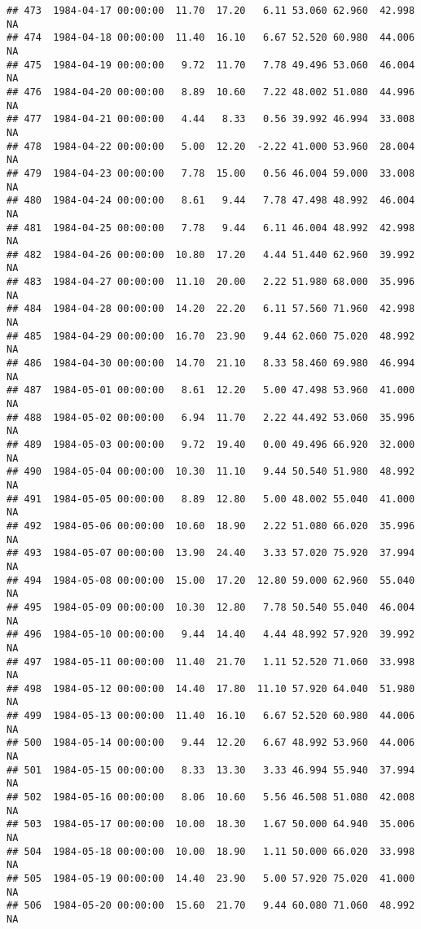 \documentclass{article}\usepackage{graphicx, color}
\makeatletter
\newenvironment{kframe}{%
 \def\at@end@of@kframe{}%
 \ifinner\ifhmode%
  \def\at@end@of@kframe{\end{minipage}}%
  \begin{minipage}{\columnwidth}%
 \fi\fi%
 \def\FrameCommand##1{\hskip\@totalleftmargin \hskip-\fboxsep
 \colorbox{shadecolor}{##1}\hskip-\fboxsep
     \hskip-\linewidth \hskip-\@totalleftmargin \hskip\columnwidth}%
 \MakeFramed {\advance\hsize-\width
   \@totalleftmargin\z@ \linewidth\hsize
   \@setminipage}}%
 {\par\unskip\endMakeFramed%
 \at@end@of@kframe}
\newenvironment{knitrout}{}{} %
\makeatother
\begin{document}
\begin{knitrout}
\begin{kframe}
\begin{verbatim}
## 473  1984-04-17 00:00:00  11.70  17.20   6.11 53.060 62.960  42.998     NA
## 474  1984-04-18 00:00:00  11.40  16.10   6.67 52.520 60.980  44.006     NA
## 475  1984-04-19 00:00:00   9.72  11.70   7.78 49.496 53.060  46.004     NA
## 476  1984-04-20 00:00:00   8.89  10.60   7.22 48.002 51.080  44.996     NA
## 477  1984-04-21 00:00:00   4.44   8.33   0.56 39.992 46.994  33.008     NA
## 478  1984-04-22 00:00:00   5.00  12.20  -2.22 41.000 53.960  28.004     NA
## 479  1984-04-23 00:00:00   7.78  15.00   0.56 46.004 59.000  33.008     NA
## 480  1984-04-24 00:00:00   8.61   9.44   7.78 47.498 48.992  46.004     NA
## 481  1984-04-25 00:00:00   7.78   9.44   6.11 46.004 48.992  42.998     NA
## 482  1984-04-26 00:00:00  10.80  17.20   4.44 51.440 62.960  39.992     NA
## 483  1984-04-27 00:00:00  11.10  20.00   2.22 51.980 68.000  35.996     NA
## 484  1984-04-28 00:00:00  14.20  22.20   6.11 57.560 71.960  42.998     NA
## 485  1984-04-29 00:00:00  16.70  23.90   9.44 62.060 75.020  48.992     NA
## 486  1984-04-30 00:00:00  14.70  21.10   8.33 58.460 69.980  46.994     NA
## 487  1984-05-01 00:00:00   8.61  12.20   5.00 47.498 53.960  41.000     NA
## 488  1984-05-02 00:00:00   6.94  11.70   2.22 44.492 53.060  35.996     NA
## 489  1984-05-03 00:00:00   9.72  19.40   0.00 49.496 66.920  32.000     NA
## 490  1984-05-04 00:00:00  10.30  11.10   9.44 50.540 51.980  48.992     NA
## 491  1984-05-05 00:00:00   8.89  12.80   5.00 48.002 55.040  41.000     NA
## 492  1984-05-06 00:00:00  10.60  18.90   2.22 51.080 66.020  35.996     NA
## 493  1984-05-07 00:00:00  13.90  24.40   3.33 57.020 75.920  37.994     NA
## 494  1984-05-08 00:00:00  15.00  17.20  12.80 59.000 62.960  55.040     NA
## 495  1984-05-09 00:00:00  10.30  12.80   7.78 50.540 55.040  46.004     NA
## 496  1984-05-10 00:00:00   9.44  14.40   4.44 48.992 57.920  39.992     NA
## 497  1984-05-11 00:00:00  11.40  21.70   1.11 52.520 71.060  33.998     NA
## 498  1984-05-12 00:00:00  14.40  17.80  11.10 57.920 64.040  51.980     NA
## 499  1984-05-13 00:00:00  11.40  16.10   6.67 52.520 60.980  44.006     NA
## 500  1984-05-14 00:00:00   9.44  12.20   6.67 48.992 53.960  44.006     NA
## 501  1984-05-15 00:00:00   8.33  13.30   3.33 46.994 55.940  37.994     NA
## 502  1984-05-16 00:00:00   8.06  10.60   5.56 46.508 51.080  42.008     NA
## 503  1984-05-17 00:00:00  10.00  18.30   1.67 50.000 64.940  35.006     NA
## 504  1984-05-18 00:00:00  10.00  18.90   1.11 50.000 66.020  33.998     NA
## 505  1984-05-19 00:00:00  14.40  23.90   5.00 57.920 75.020  41.000     NA
## 506  1984-05-20 00:00:00  15.60  21.70   9.44 60.080 71.060  48.992     NA

\end{verbatim}
\end{kframe}
\end{knitrout}
\end{document}
